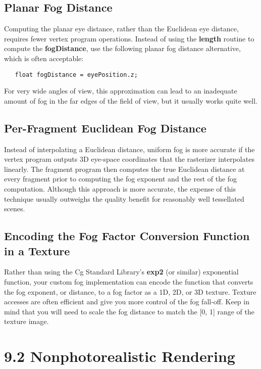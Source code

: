 \documentclass[../main.tex]{subfiles}
\begin{document}
\subsection*{Planar Fog Distance}

Computing the planar eye distance, rather than the Euclidean eye distance, requires fewer vertex program operations. Instead of using the \textbf{length} routine to compute the \textbf{fogDistance}, use the following planar fog distance alternative, which is often acceptable:

\FloatBarrier
\begin{lstlisting}
   float fogDistance = eyePosition.z;
\end{lstlisting}
\FloatBarrier

For very wide angles of view, this approximation can lead to an inadequate amount of fog in the far edges of the field of view, but it usually works quite well.

\subsection*{Per-Fragment Euclidean Fog Distance}

Instead of interpolating a Euclidean distance, uniform fog is more accurate if the vertex program outputs 3D eye-space coordinates that the rasterizer interpolates linearly. The fragment program then computes the true Euclidean distance at every fragment prior to computing the fog exponent and the rest of the fog computation. Although this approach is more accurate, the expense of this technique usually outweighs the quality benefit for reasonably well tessellated scenes.

\subsection*{Encoding the Fog Factor Conversion Function in a Texture}

Rather than using the Cg Standard Library's \textbf{exp2} (or similar) exponential function, your custom fog implementation can encode the function that converts the fog exponent, or distance, to a fog factor as a 1D, 2D, or 3D texture. Texture accesses are often efficient and give you more control of the fog fall-off. Keep in mind that you will need to scale the fog distance to match the [0, 1] range of the texture image.

\section{9.2 Nonphotorealistic Rendering}
\end{document}
